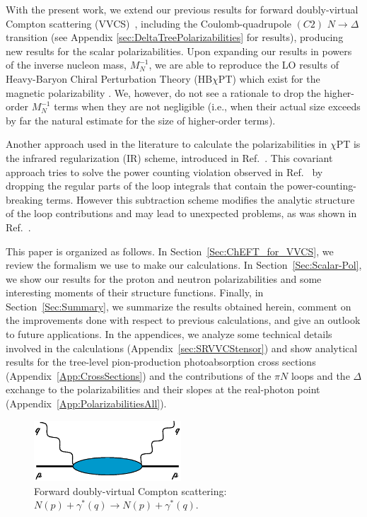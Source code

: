 \documentclass[11pt,preprint,tightenlines,
showpacs,preprintnumbers,amsmath,amssymb,superscriptaddress,a4paper,nofootinbib]{revtex4-1}
\begin{document}
With the present work, we extend our previous results for forward doubly-virtual Compton scattering (VVCS)~\cite{Lensky:2014dda},
including the
Coulomb-quadrupole $(C2)$ $N\to \Delta$ transition \cite{Pascalutsa:2005vq,Pascalutsa:2005ts} (see Appendix \ref{sec:DeltaTreePolarizabilities} for results), producing new results for the scalar polarizabilities.
Upon expanding our results in powers of the inverse nucleon mass, $M_N^{-1}$, we are able to reproduce the LO results
of Heavy-Baryon Chiral Perturbation Theory (HB$\chi$PT) 
which exist for the magnetic polarizability \cite{Birse:2012eb}. 
We, however, do not see a rationale to drop the higher-order $M_N^{-1}$ terms when they are not 
negligible (i.e., when their actual size exceeds by far the natural estimate
for the size of higher-order terms).


 Another approach used in the literature to calculate the polarizabilities in $\chi$PT is the infrared regularization (IR) scheme, introduced in Ref.~\cite{Becher:1999he}. 
This covariant approach tries to solve the power counting violation observed in Ref.~\cite{Gasser:1987rb} by dropping the regular parts of the loop integrals that contain the power-counting-breaking terms. However this subtraction scheme modifies the analytic structure of the loop contributions and may lead to unexpected problems, as was shown in Ref.~\cite{Geng:2008mf}.





This paper is organized as follows. In Section~\ref{Sec:ChEFT_for_VVCS}, we review the formalism we use to make our calculations. In Section~\ref{Sec:Scalar-Pol}, we show our results for the proton and neutron polarizabilities and some interesting moments of their structure functions. Finally, in Section\ \ref{Sec:Summary}, we summarize the results obtained herein, comment on the improvements done with respect to previous calculations, and give an outlook to future applications. In the appendices, we analyze some technical details involved in the calculations (Appendix~\ref{sec:SRVVCStensor}) and show  analytical results for the tree-level pion-production photoabsorption cross sections (Appendix~\ref{App:CrossSections}) and the contributions of the $\pi N$ loops and the $\Delta$ exchange to the polarizabilities and their slopes at the real-photon point (Appendix~\ref{App:PolarizabilitiesAll}). 

\begin{figure}[t]
\centering
       \includegraphics[width=5.5cm]{frwCSgeneric.eps}
\caption{Forward doubly-virtual Compton scattering: $N(p)+\gamma^*(q)\rightarrow N(p)+\gamma^*(q)$.  \label{fig:CSgeneric}}
\end{figure}
\end{document}

